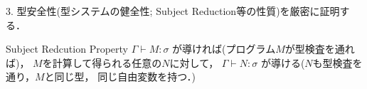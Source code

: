 \documentclass[dvipdfmx,cjk,xcolor=dvipsnames,envcountsect,notheorems,12pt,handout]{beamer} \usepackage{pgfpages} \pgfpagesuselayout{4 on 1}[a4paper,landscape,border shrink=5mm]
\theoremstyle{definition}
\begin{document}
\begin{appendix}
\begin{frame}[fragile]
  3. 型安全性(型システムの健全性; Subject Reduction等の性質)を厳密に証明する．

  \begin{block}{Subject Redcution Property}
    $\Gamma \vdash M: \sigma$ が導ければ(プログラム$M$が型検査を通れば)，
    $M$を計算して得られる任意の$N$に対して，
    $\Gamma \vdash N: \sigma$ が導ける($N$も型検査を通り，$M$と同じ型，
    同じ自由変数を持つ．)
  \end{block}

\end{frame}




\end{appendix}
\end{document}
